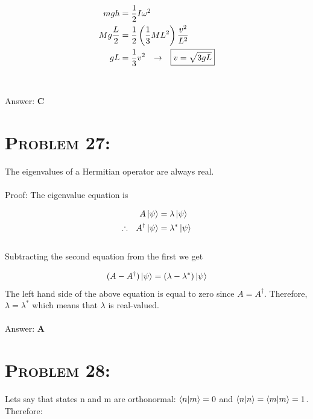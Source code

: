 \documentclass{article}
\begin{document}
\begin{align}
m g h &= \frac{1}{2} I \omega^{2}  \nonumber\\
M g \frac{L}{2} &= \frac{1}{2} \left(  \frac{1}{3} M L^{2}  \right) \frac{v^{2}}{L^{2}}   \nonumber\\
gL &= \frac{1}{3}v^{2} \hspace{.1in} \rightarrow \hspace{.1in} \boxed{v = \sqrt{3gL}}  \nonumber
\end{align}
\\\\
Answer: \textbf{\textcolor{ProcessBlue}C}\\


\section{\textsc{Problem 27:}} The eigenvalues of a Hermitian operator are always real.\\
\\
Proof: The eigenvalue equation is

\begin{align}
A \ket{\psi} &= \lambda \ket{\psi}\nonumber\\
\therefore \hspace{.1in} A^{\dag} \ket{\psi} &= \lambda^{*} \ket{\psi}\nonumber
\end{align}
\\
Subtracting the second equation from the first we get

\begin{gather}
( A - A^{\dag} )\ket{\psi} = ( \lambda - \lambda^{*} ) \ket{\psi}\nonumber
\end{gather}
The left hand side of the above equation is equal to zero since $A = A^{\dag}$. Therefore, $\lambda = \lambda^{*}$ which means that $\lambda$ is real-valued.
\\\\
Answer: \textbf{\textcolor{ProcessBlue}A}\\


\section{\textsc{Problem 28:}} Lets say that states n and m are orthonormal: $\braket{ n  | m } = 0$ and $\braket{ n  | n } = \braket{ m  | m } = 1$. Therefore:
\end{document}
